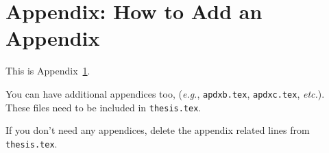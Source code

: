 
\chapter{Appendix: How to Add an Appendix}\label{apdx:a}

This is Appendix~\ref{apdx:a}.

You can have additional appendices too, (\emph{e.g.}, \texttt{apdxb.tex},
\texttt{apdxc.tex}, \emph{etc.}). These files need to be included in
\texttt{thesis.tex}.

If you don't need any appendices, delete the appendix
related lines from \texttt{thesis.tex}.
